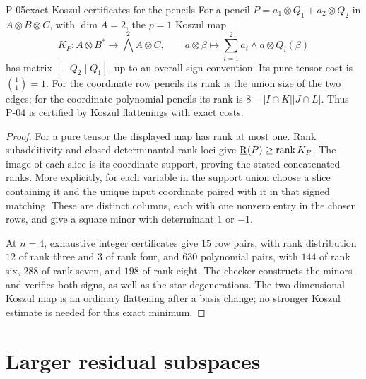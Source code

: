 \begin{finding}{P-05}{exact Koszul certificates for the pencils}
For a pencil \(P=a_1\otimes Q_1+a_2\otimes Q_2\) in
\(A\otimes B\otimes C\), with \(\dim A=2\), the \(p=1\)
Koszul map
\[
 K_P:A\otimes B^*\longrightarrow\bigwedge^2A\otimes C,
 \qquad
 a\otimes\beta\longmapsto
 \sum_{i=1}^2a_i\wedge a\otimes Q_i(\beta)
\]
has matrix \([-Q_2\mid Q_1]\), up to an overall sign convention.
Its pure-tensor cost is \(\binom11=1\).
For the coordinate row pencils its rank is the union size of
the two edges; for the coordinate polynomial pencils its rank
is \(8-|I\cap K||J\cap L|\). Thus P-04 is certified by
Koszul flattenings with exact costs.
\end{finding}
\begin{proof}
For a pure tensor the displayed map has rank at most one.
Rank subadditivity and closed determinantal rank loci give
\(\underline{\mathrm R}(P)\geq\operatorname{rank}K_P\).
The image of each slice is its coordinate support, proving
the stated concatenated ranks. More explicitly, for each
variable in the support union choose a slice containing it
and the unique input coordinate paired with it in that
signed matching. These are distinct columns, each with one
nonzero entry in the chosen rows, and give a square minor
with determinant \(1\) or \(-1\).

At \(n=4\), exhaustive integer certificates give \(15\) row
pairs, with rank distribution \(12\) of rank three and \(3\)
of rank four, and \(630\) polynomial pairs, with \(144\) of
rank six, \(288\) of rank seven, and \(198\) of rank eight.
The checker  constructs the minors
and verifies both signs, as well as the star degenerations.
The two-dimensional Koszul map is an ordinary flattening
after a basis change; no stronger Koszul estimate is needed
for this exact minimum.
\end{proof}

\section{Larger residual subspaces}

